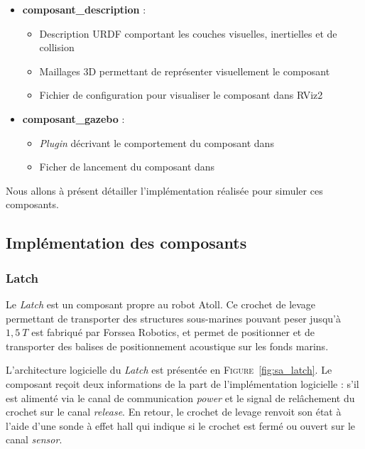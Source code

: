 			\begin{itemize}
				\renewcommand{\labelitemi}{\textbullet}
				\item \textbf{composant\_description} :
				\begin{itemize}[noitemsep]
					\item Description URDF comportant les couches visuelles, inertielles et de collision
					\item Maillages 3D permettant de représenter visuellement le composant
					\item Fichier de configuration pour visualiser le composant dans RViz2
				\end{itemize}
				\item \textbf{composant\_gazebo} :
				\begin{itemize}[noitemsep]
					\item \textit{Plugin} décrivant le comportement du composant dans \gazebo{}
					\item Ficher de lancement du composant dans \gazebo{}
				\end{itemize}
			\end{itemize}

		Nous allons à présent détailler l'implémentation réalisée pour simuler ces composants.

		\subsection{Implémentation des composants}

			\subsubsection{Latch}

				Le \textit{Latch} est un composant propre au robot \gls{Atoll}. Ce crochet de levage permettant de transporter des structures sous-marines pouvant peser jusqu'à $1,5\ T$ est fabriqué par Forssea Robotics, et permet de positionner et de transporter des balises de positionnement acoustique sur les fonds marins.

				L'architecture logicielle du \textit{Latch} est présentée en \textsc{Figure}~\ref{fig:sa_latch}. Le composant reçoit deux informations de la part de l'implémentation logicielle : s'il est alimenté via le canal de communication \textit{power} et le signal de relâchement du crochet sur le canal \textit{release}. En retour, le crochet de levage renvoit son état à l'aide d'une sonde à effet hall qui indique si le crochet est fermé ou ouvert sur le canal \textit{sensor}.

